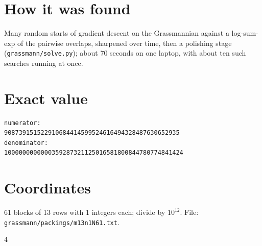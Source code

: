 \documentclass[11pt,a4paper]{article}
\begin{document}
\section{How it was found}
Many random starts of gradient descent on the Grassmannian against a log-sum-exp of the pairwise overlaps, sharpened over time, then a polishing stage (\texttt{grassmann/solve.py}); about 70 seconds on one laptop, with about ten such searches running at once.


\appendix
\section{Exact value}
{\small
\begin{verbatim}
numerator:
908739151522910684414599524616494328487630652935
denominator:
1000000000000359287321125016581800844780774841424
\end{verbatim}}

\section{Coordinates}
61 blocks of 13 rows with 1 integers each; divide by $10^{12}$. File: \texttt{grassmann/packings/m13n1N61.txt}.
{\tiny
\begin{multicols}{4}
\end{multicols}}
\end{document}
